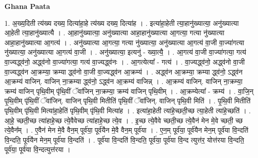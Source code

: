 \documentclass[17pt]{extarticle}
\begin{document}
\textbf{Ghana Paata } \newline

1. अ॒ख्य॒दिती त्य॑ख्य दख्य॒ दित्या॑हा॒हे त्य॑ख्य दख्य॒ दित्या॑ह । . इत्या॑हा॒हेती त्या॒हानु॑ख्यात्या॒ अनु॑ख्यात्या आ॒हेती त्या॒हानु॑ख्यात्यै । . आ॒हानु॑ख्यात्या॒ अनु॑ख्यात्या आहा॒हानु॑ख्यात्या आ॒गत्या॒ गत्या नु॑ख्यात्या आहा॒हानु॑ख्यात्या आ॒गत्य॑ । . अनु॑ख्यात्या आ॒गत्या॒ गत्या नु॑ख्यात्या॒ अनु॑ख्यात्या आ॒गत्य॑ वा॒जी वा॒ज्या॑गत्या नु॑ख्यात्या॒ अनु॑ख्यात्या आ॒गत्य॑ वा॒जी । . अनु॑ख्यात्या॒ इत्यनु॑ - ख्या॒त्यै॒ । . आ॒गत्य॑ वा॒जी वा॒ज्या॑गत्या॒ गत्य॑ वा॒ज्यद्ध्व॑नो॒ अद्ध्व॑नो वा॒ज्या॑गत्या॒ गत्य॑ वा॒ज्यद्ध्व॑नः । . आ॒गत्येत्या᳚ - गत्य॑ । . वा॒ज्यद्ध्व॑नो॒ अद्ध्व॑नो वा॒जी वा॒ज्यद्ध्व॑न आ॒क्रम्या॒ क्रम्या द्ध्व॑नो वा॒जी वा॒ज्यद्ध्व॑न आ॒क्रम्य॑ । . अद्ध्व॑न आ॒क्रम्या॒ क्रम्या द्ध्व॑नो॒ ऽद्ध्व॑न आ॒क्रम्य॑ वाजिन्. वाजिन् ना॒क्रम्या द्ध्व॑नो॒ ऽद्ध्व॑न आ॒क्रम्य॑ वाजिन्न् । . आ॒क्रम्य॑ वाजिन्. वाजिन् ना॒क्रम्या॒ क्रम्य॑ वाजिन् पृथि॒वीम् पृ॑थि॒वीं ॅवा॑जिन् ना॒क्रम्या॒ क्रम्य॑ वाजिन् पृथि॒वीम् । . आ॒क्रम्येत्या᳚ - क्रम्य॑ । . वा॒जि॒न् पृ॒थि॒वीम् पृ॑थि॒वीं ॅवा॑जिन्. वाजिन् पृथि॒वी मितीति॑ पृथि॒वीं ॅवा॑जिन्. वाजिन् पृथि॒वी मिति॑ । . पृ॒थि॒वी मितीति॑ पृथि॒वीम् पृ॑थि॒वी मित्या॑हा॒हेति॑ पृथि॒वीम् पृ॑थि॒वी मित्या॑ह । . इत्या॑हा॒हेती त्या॑हे॒च्छती॒च्छ त्या॒हेती त्या॑हे॒च्छति॑ । . आ॒हे॒ च्छती॒च्छ त्या॑हाहे॒च्छ त्ये॒वैवेच्छ त्या॑हाहे॒च्छ त्ये॒व । . इ॒च्छ त्ये॒वैवे च्छती॒च्छ त्ये॒वैन॑ मेन मे॒वे च्छती॒ च्छ त्ये॒वैन᳚म् । . ए॒वैन॑ मेन मे॒वै वैन॒म् पूर्व॑या॒ पूर्व॑यैन मे॒वै वैन॒म् पूर्व॑या । . ए॒न॒म् पूर्व॑या॒ पूर्व॑यैन मेन॒म् पूर्व॑या वि॒न्दति॑ वि॒न्दति॒ पूर्व॑यैन मेन॒म् पूर्व॑या वि॒न्दति॑ । . पूर्व॑या वि॒न्दति॑ वि॒न्दति॒ पूर्व॑या॒ पूर्व॑या वि॒न्द त्युत्त॑र॒ योत्त॑रया वि॒न्दति॒ पूर्व॑या॒ पूर्व॑या वि॒न्दत्युत्त॑रया । \newline
\end{document}
